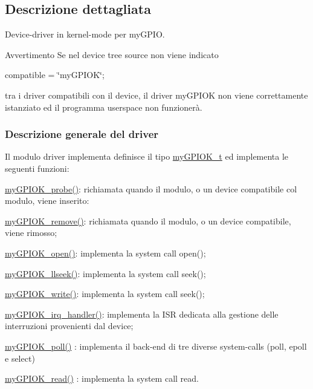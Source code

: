\subsection{Descrizione dettagliata}
Device-\/driver in kernel-\/mode per my\+G\+P\+IO. 

\begin{DoxyWarning}{Avvertimento}
Se nel device tree source non viene indicato \begin{center}compatible = \char`\"{}my\+G\+P\+I\+O\+K\char`\"{};\end{center}  tra i driver compatibili con il device, il driver my\+G\+P\+I\+OK non viene correttamente istanziato ed il programma userspace non funzionerà.
\end{DoxyWarning}
\subsubsection*{Descrizione generale del driver}

Il modulo driver implementa definisce il tipo \hyperlink{structmy_g_p_i_o_k__t}{my\+G\+P\+I\+O\+K\+\_\+t} ed implementa le seguenti funzioni\+:
\begin{DoxyItemize}
\item \hyperlink{group___linux-_driver_gae40973a06d72f7c41a9af07513a62307}{my\+G\+P\+I\+O\+K\+\_\+probe()}\+: richiamata quando il modulo, o un device compatibile col modulo, viene inserito\+:
\item \hyperlink{group___linux-_driver_ga59fddfaa36dea357f4bbdfceb0f47f8c}{my\+G\+P\+I\+O\+K\+\_\+remove()}\+: richiamata quando il modulo, o un device compatibile, viene rimosso;
\item \hyperlink{group___linux-_driver_gad013759c18fbf6ea96005b9b3bfa5b4e}{my\+G\+P\+I\+O\+K\+\_\+open()}\+: implementa la system call open();
\item \hyperlink{group___linux-_driver_ga66e7f726b72320a272b633ecbaecefff}{my\+G\+P\+I\+O\+K\+\_\+llseek()}\+: implementa la system call seek();
\item \hyperlink{group___linux-_driver_ga1eea0f6c86e8966ba9b701da57502aad}{my\+G\+P\+I\+O\+K\+\_\+write()}\+: implementa la system call seek();
\item \hyperlink{group___linux-_driver_ga2fc230a12a97aa63e43b2dc4aec73511}{my\+G\+P\+I\+O\+K\+\_\+irq\+\_\+handler()}\+: implementa la I\+SR dedicata alla gestione delle interruzioni provenienti dal device;
\item \hyperlink{group___linux-_driver_gaba935e8a8215c2ebce9a7147fd4f5147}{my\+G\+P\+I\+O\+K\+\_\+poll()} \+: implementa il back-\/end di tre diverse system-\/calls (poll, epoll e select)
\item \hyperlink{group___linux-_driver_ga90ac339df9c02ae5f11a2a7727adc923}{my\+G\+P\+I\+O\+K\+\_\+read()} \+: implementa la system call read.
\end{DoxyItemize}

